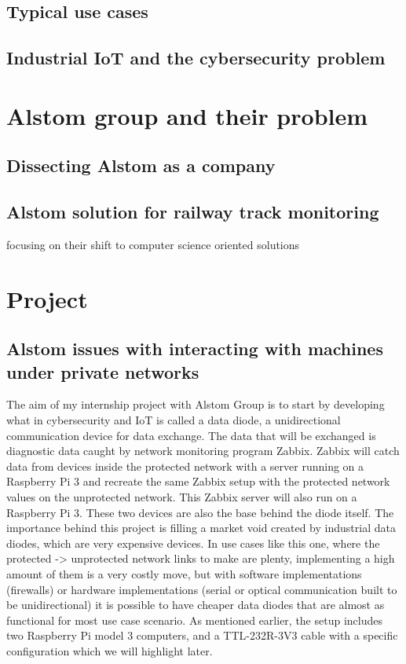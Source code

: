 \documentclass[a4paper, 12pt]{book}
\begin{document}
\section{Typical use cases}
\section{Industrial IoT and the cybersecurity problem}

\chapter{Alstom group and their problem}

\section{Dissecting Alstom as a company}
\section{Alstom solution for railway track monitoring}
focusing on their shift to computer science oriented solutions

\chapter{Project}

\section{Alstom issues with interacting with machines under private networks}
The aim of my internship project with Alstom Group is to start by developing what in cybersecurity and IoT is called a data diode, a unidirectional communication device for data exchange.
The data that will be exchanged is diagnostic data caught by network monitoring program Zabbix. Zabbix will catch data from devices inside the protected network with a server running on a Raspberry Pi 3 and recreate the same Zabbix setup with the protected network values on the unprotected network. This Zabbix server will also run on a Raspberry Pi 3. These two devices are also the base behind the diode itself.
The importance behind this project is filling a market void created by industrial data diodes, which are very expensive devices. In use cases like this one, where the protected -> unprotected network links to make are plenty, implementing a high amount of them is a very costly move, but with software implementations (firewalls) or hardware implementations (serial or optical communication built to be unidirectional) it is possible to have cheaper data diodes that are almost as functional for most use case scenario. As mentioned earlier, the setup includes two Raspberry Pi model 3 computers, and a TTL-232R-3V3 cable with a specific configuration which we will highlight later.
\end{document}
